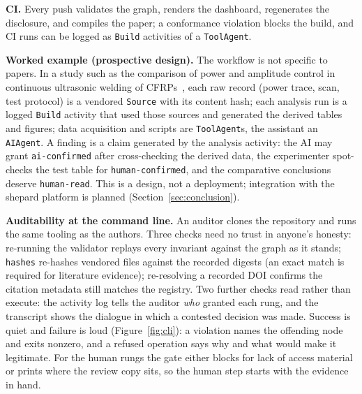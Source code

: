 \textbf{CI.} Every push validates the graph, renders the dashboard,
regenerates the disclosure, and compiles the paper; a conformance
violation blocks the build, and CI runs can be logged as \texttt{Build}
activities of a \texttt{ToolAgent}.

\textbf{Worked example (prospective design).} The workflow is not
specific to papers. In a study such as the comparison of power and
amplitude control in continuous ultrasonic welding of
CFRPs~\cite{ultrasonic-welding2025}, each raw record (power trace,
scan, test protocol) is a vendored \texttt{Source} with its content
hash; each analysis run is a logged \texttt{Build} activity that used
those sources and generated the derived tables and figures; data
acquisition and scripts are \texttt{ToolAgent}s, the assistant an
\texttt{AIAgent}. A finding is a claim generated by the analysis
activity: the AI may grant \texttt{ai-confirmed} after cross-checking
the derived data, the experimenter spot-checks the test table for
\texttt{human-confirmed}, and the comparative conclusions deserve
\texttt{human-read}. This is a design, not a deployment; integration
with the shepard platform is planned
(Section~\ref{sec:conclusion}).

\textbf{Auditability at the command line.} An auditor clones the
repository and runs the same tooling as the authors. Three checks need
no trust in anyone's honesty: re-running the validator replays every
invariant against the graph as it stands; \texttt{hashes} re-hashes
vendored files against the recorded digests (an exact match is required
for literature evidence); re-resolving a recorded DOI confirms the
citation metadata still matches the registry. Two further checks read
rather than execute: the activity log tells the auditor \emph{who}
granted each rung, and the transcript shows the dialogue in which a
contested decision was made. Success is quiet and failure is loud
(Figure~\ref{fig:cli}): a violation names the offending node and exits
nonzero, and a refused operation says why and what would make it
legitimate. For the human rungs the gate either blocks for lack of
access material or prints where the review copy sits, so the human step
starts with the evidence in hand.

